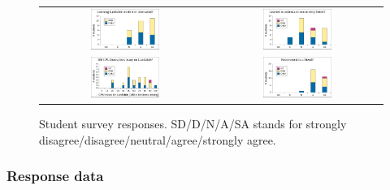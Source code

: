 \begin{figure}[p]
\begin{center}
\begin{tabular}{cc}
			\includegraphics[width=0.42\textwidth]{survey7.pdf} &
			\includegraphics[width=0.42\textwidth]{survey8.pdf} \\
			\includegraphics[width=0.42\textwidth]{survey9.pdf} &
			\includegraphics[width=0.42\textwidth]{survey10.pdf} \\
		\end{tabular}
	\end{center}
	\caption{Student survey responses.
	SD/D/N/A/SA stands for
	strongly disagree/\allowbreak{}disagree/\allowbreak{}neutral/\allowbreak{}agree/\allowbreak{}strongly agree.}
	\label{fig:survey}
\end{figure}

\subsubsection{Response data}

